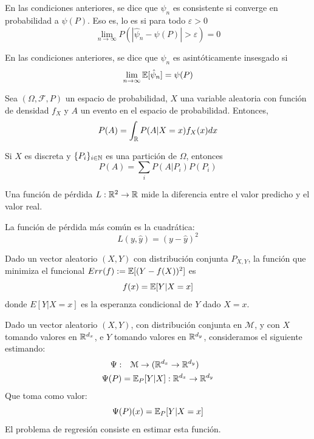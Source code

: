 \begin{definicion}\label{def:estimador-consistente}
    En las condiciones anteriores, se dice que $\hat\psi_n$ es consistente
    si converge en probabilidad a $\psi(P)$. Eso es, lo es si para todo $\varepsilon > 0$
    \[
        \lim_{n\to\infty} P(|\hat\psi_n - \psi(P)| > \varepsilon) = 0
    \]
\end{definicion}

\begin{definicion}\label{def:insesgadez-asintotica}
    En las condiciones anteriores, se dice que $\hat\psi_n$ es asintóticamente insesgado si
    \[
        \lim_{n\to\infty}\mathbb{E}[\hat\psi_n] = \psi(P)
    \]
\end{definicion}

\begin{teorema}\label{thm:probabilidad-total}
    Sea $(\Omega, \mathcal{F}, P)$ un espacio de probabilidad, $X$ una variable aleatoria
    con función de densidad $f_X$ y $A$ un evento en el espacio de probabilidad.
    Entonces,
    \[
        P(A) = \int_{\mathbb{R}} P(A | X = x)f_X(x)dx
    \]

    Si $X$ es discreta y $\{P_i\}_{i\in\mathbb{N}}$ es una partición de $\Omega$, entonces
    \[
        P(A) = \sum_i P(A | P_i) P(P_i)
    \]
\end{teorema}

\begin{definicion}\cite[2.4]{elements_of_statistical_learning}
    Una función de pérdida $L: \mathbb{R}^2 \to \mathbb{R}$ mide la diferencia entre el valor predicho y el valor real.
\end{definicion}

\begin{ejemplo}
    La función de pérdida más común es la cuadrática:
    \[
        L(y, \hat{y}) = (y - \hat{y})^2
    \]
\end{ejemplo}

\begin{proposicion}
    Dado un vector aleatorio $(X, Y)$ con distribución conjunta $P_{X, Y}$, la función que
    minimiza el funcional $Err(f) := \mathbb{E}[(Y - f(X))^2]$ es
    \[
        f(x) = \mathbb{E}[Y | X = x]
    \]
    donde $E[Y | X = x]$ es la esperanza condicional de $Y$ dado $X = x$.
\end{proposicion}

\begin{definicion} %
    Dado un vector aleatorio $(X,Y)$, con distribución conjunta en $\mathcal{M}$,
    y con $X$ tomando valores en $\mathbb{R}^{d_x}$, e $Y$ tomando valores en $\mathbb{R}^{d_y}$,
    consideramos el siguiente estimando:
    \begin{align*}
        \Psi:   & \quad \mathcal{M} \to (\mathbb{R}^{d_x} \to \mathbb{R}^{d_y}) \\
        \Psi(P) & = \mathbb{E}_P[Y | X] : \mathbb{R}^{d_x} \to \mathbb{R}^{d_y}
    \end{align*}
    Que toma como valor:
    \[
        \Psi(P)(x) = \mathbb{E}_P[Y | X = x]
    \]
    El problema de regresión consiste en estimar esta función.
\end{definicion}


